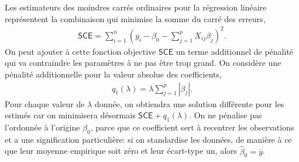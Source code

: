 \documentclass[
  11pt,
  letterpaper,
]{scrbook}
\theoremstyle{definition}
\theoremstyle{remark}
\begin{document}
Les estimateurs des moindres carrés ordinaires pour la régression
linéaire représentent la combinaison qui minimise la somme du carré des
erreurs, \begin{align*}
\mathsf{SCE} = \sum_{i=1}^n \left(y_i - \beta_0 - \sum_{j=1}^pX_{ij}\beta_{j}\right)^2.
\end{align*} On peut ajouter à cette fonction objective \(\mathsf{SCE}\)
un terme additionnel de pénalité qui va contraindre les paramètres à ne
pas être trop grand. On considère une pénalité additionnelle pour la
valeur absolue des coefficients, \begin{align*}
q_1(\lambda) = \lambda \sum_{j=1}^p |\beta_j|.
\end{align*} Pour chaque valeur de \(\lambda\) donnée, on obtiendra une
solution différente pour les estimés car on minimisera désormais
\(\mathsf{SCE} + q_1(\lambda)\). On ne pénalise pas l'ordonnée à
l'origine \(\beta_0\), parce que ce coefficient sert à recentrer les
observations et a une signification particulière: si on standardise les
données, de manière à ce que leur moyenne empirique soit zéro et leur
écart-type un, alors \(\widehat{\beta}_0 = \overline{y}\).
\end{document}
